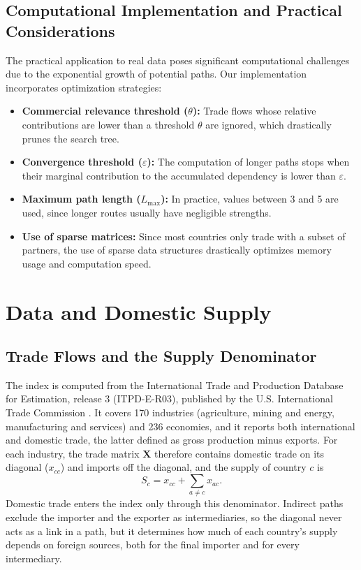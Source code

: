 \documentclass[final,1p,times,authoryear]{elsarticle}
\begin{document}
\subsection{Computational Implementation and Practical Considerations}
The practical application to real data poses significant computational challenges due to the exponential growth of potential paths. Our implementation incorporates optimization strategies:
\begin{itemize}
    \item \textbf{Commercial relevance threshold ($\theta$):} Trade flows whose relative contributions are lower than a threshold $\theta$ are ignored, which drastically prunes the search tree.
    \item \textbf{Convergence threshold ($\varepsilon$):} The computation of longer paths stops when their marginal contribution to the accumulated dependency is lower than $\varepsilon$.
    \item \textbf{Maximum path length ($L_{\max}$):} In practice, values between 3 and 5 are used, since longer routes usually have negligible strengths.
    \item \textbf{Use of sparse matrices:} Since most countries only trade with a subset of partners, the use of sparse data structures drastically optimizes memory usage and computation speed.
\end{itemize}

\section{Data and Domestic Supply}\label{sec:data}

\subsection{Trade Flows and the Supply Denominator}
The index is computed from the International Trade and Production Database for Estimation, release 3 (ITPD-E-R03), published by the U.S. International Trade Commission \citep{Borchert2021}. It covers 170 industries (agriculture, mining and energy, manufacturing and services) and 236 economies, and it reports both international and domestic trade, the latter defined as gross production minus exports. For each industry, the trade matrix $\mathbf{X}$ therefore contains domestic trade on its diagonal ($x_{cc}$) and imports off the diagonal, and the supply of country $c$ is
\begin{equation}
S_c = x_{cc} + \sum_{a \neq c} x_{ac}.
\end{equation}
Domestic trade enters the index only through this denominator. Indirect paths exclude the importer and the exporter as intermediaries, so the diagonal never acts as a link in a path, but it determines how much of each country's supply depends on foreign sources, both for the final importer and for every intermediary.
\end{document}

